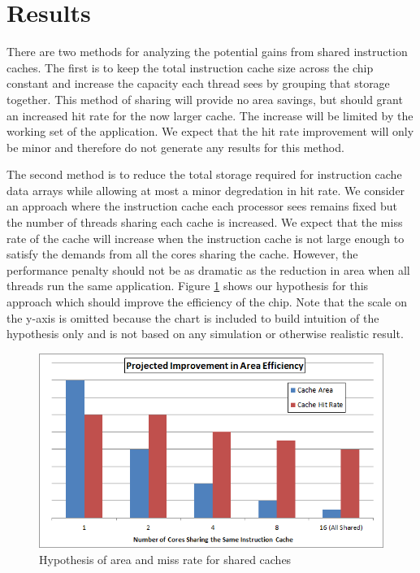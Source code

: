 \section{Results}

There are two methods for analyzing the potential gains from shared
instruction caches.
The first is to keep the total instruction cache size across the chip
constant and increase the capacity each thread sees by grouping that
storage together.
This method of sharing will provide no area savings, but should grant
an increased hit rate for the now larger cache.
The increase will be limited by the working set of the application.
We expect that the hit rate improvement will only be minor and
therefore do not generate any results for this method.


The second method is to reduce the total storage required for
instruction cache data arrays while allowing at most a minor
degredation in hit rate.
We consider an approach where the instruction cache each processor
sees remains fixed but the number of threads sharing each cache is
increased. 
We expect that the miss rate of the cache will increase when the instruction
cache is not large enough to satisfy the demands from all the cores
sharing the cache.
However, the performance penalty should not be as dramatic as the
reduction in area when all threads run the same application.
Figure \ref{AreaEff} shows our hypothesis for this approach
which should improve the efficiency of the chip.
Note that the scale on the y-axis is omitted because the chart is included
to build intuition of the hypothesis only and is not based on 
any simulation or otherwise realistic result.

\begin{figure}
\centering
\includegraphics[width=\columnwidth]{AreaEff.png}
\caption{Hypothesis of area and miss rate for shared caches}
\label{AreaEff}
\end{figure}


